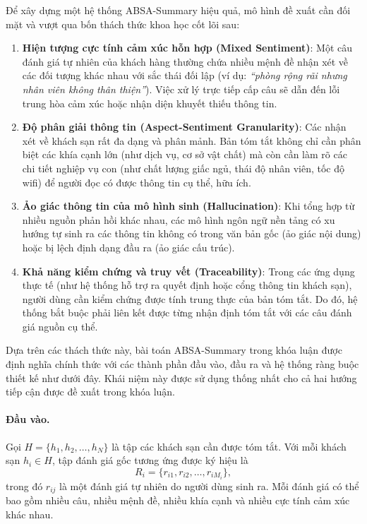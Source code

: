 Để xây dựng một hệ thống ABSA-Summary hiệu quả, mô hình đề xuất cần đối mặt và vượt qua bốn thách thức khoa học cốt lõi sau:
\begin{enumerate}[leftmargin=1.2cm]
    \item \textbf{Hiện tượng cực tính cảm xúc hỗn hợp (Mixed Sentiment)}: Một câu đánh giá tự nhiên của khách hàng thường chứa nhiều mệnh đề nhận xét về các đối tượng khác nhau với sắc thái đối lập (ví dụ: \textit{``phòng rộng rãi nhưng nhân viên không thân thiện''}). Việc xử lý trực tiếp cấp câu sẽ dẫn đến lỗi trung hòa cảm xúc hoặc nhận diện khuyết thiếu thông tin.
    \item \textbf{Độ phân giải thông tin (Aspect-Sentiment Granularity)}: Các nhận xét về khách sạn rất đa dạng và phân mảnh. Bản tóm tắt không chỉ cần phân biệt các khía cạnh lớn (như dịch vụ, cơ sở vật chất) mà còn cần làm rõ các chi tiết nghiệp vụ con (như chất lượng giấc ngủ, thái độ nhân viên, tốc độ wifi) để người đọc có được thông tin cụ thể, hữu ích.
    \item \textbf{Ảo giác thông tin của mô hình sinh (Hallucination)}: Khi tổng hợp từ nhiều nguồn phản hồi khác nhau, các mô hình ngôn ngữ nền tảng có xu hướng tự sinh ra các thông tin không có trong văn bản gốc (ảo giác nội dung) hoặc bị lệch định dạng đầu ra (ảo giác cấu trúc).
    \item \textbf{Khả năng kiểm chứng và truy vết (Traceability)}: Trong các ứng dụng thực tế (như hệ thống hỗ trợ ra quyết định hoặc cổng thông tin khách sạn), người dùng cần kiểm chứng được tính trung thực của bản tóm tắt. Do đó, hệ thống bắt buộc phải liên kết được từng nhận định tóm tắt với các câu đánh giá nguồn cụ thể.
\end{enumerate}

Dựa trên các thách thức này, bài toán ABSA-Summary trong khóa luận được định nghĩa chính thức với các thành phần đầu vào, đầu ra và hệ thống ràng buộc thiết kế như dưới đây. Khái niệm này được sử dụng thống nhất cho cả hai hướng tiếp cận được đề xuất trong khóa luận.


\paragraph{Đầu vào.}
Gọi $H = \{h_1, h_2, \dots, h_N\}$ là tập các khách sạn cần được tóm tắt.
Với mỗi khách sạn $h_i \in H$, tập đánh giá gốc tương ứng được ký hiệu là
%
\begin{equation}
  R_i = \{r_{i1}, r_{i2}, \dots, r_{iM_i}\},
  \label{eq:tap-danh-gia-goc}
\end{equation}
%
trong đó $r_{ij}$ là một đánh giá tự nhiên do người dùng sinh ra. Mỗi đánh
giá có thể bao gồm nhiều câu, nhiều mệnh đề, nhiều khía cạnh và nhiều cực
tính cảm xúc khác nhau.

